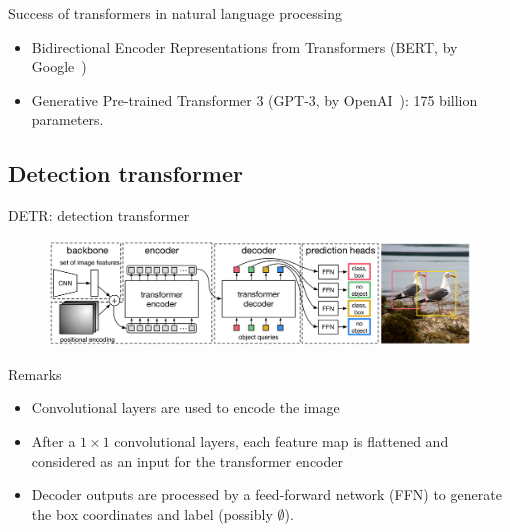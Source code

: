 \documentclass[xcolor=pdftex,dvipsnames,table,mathserif]{beamer}
\begin{document}
\begin{frame}{Success of transformers in natural language processing}

  \begin{itemize}
  \item Bidirectional Encoder Representations from Transformers (BERT, by Google~\cite{brown_language_2020})
  \item Generative Pre-trained Transformer 3 (GPT-3, by OpenAI~\cite{devlin_bert_2019}): 175 billion parameters.

  \end{itemize}
\end{frame}


\subsection{Detection transformer}

\begin{frame}{DETR: detection transformer~\cite{carion_end--end_2020}}

\begin{figure}[ht]
  \centering
  \includegraphics[width=\textwidth]{end_to_end_transformer}
\end{figure}


\begin{block}{Remarks}
  \begin{itemize}
  \item Convolutional layers are used to encode the image
  \item After a $1 \times 1$ convolutional layers, each feature map is flattened and considered as an input for the transformer encoder
  \item Decoder outputs are processed by a feed-forward network (FFN) to generate the box coordinates and label (possibly $\emptyset$).
  \end{itemize}
\end{block}

\end{frame}
\end{document}
